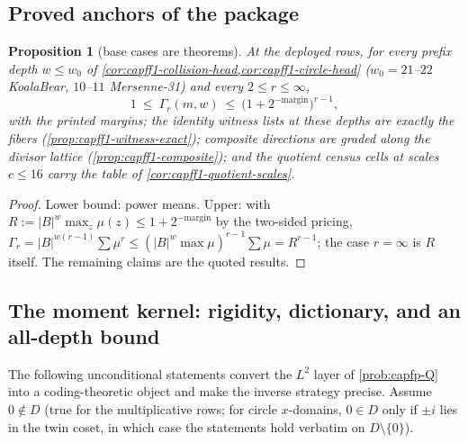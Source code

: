\documentclass[11pt]{article}
\newtheorem{proposition}[proposition]{Proposition}
\theoremstyle{definition}
\theoremstyle{remark}
\newcommand{\B}{B}
\begin{document}
\subsection{Proved anchors of the package}

\begin{proposition}[base cases are theorems]\label{prop:capfp-anchors}
At the deployed rows, for every prefix depth $w\le w_0$ of \cref{cor:capff1-collision-head,cor:capff1-circle-head} \textup($w_0=21$--$22$ KoalaBear, $10$--$11$ Mersenne-31\textup) and every $2\le r\le\infty$,
\[
        1\ \le\ \Gamma_r(m,w)\ \le\ \bigl(1+2^{-\mathrm{margin}}\bigr)^{r-1},
\]
with the printed margins; the identity witness lists at these depths are exactly the fibers \textup(\cref{prop:capff1-witness-exact}\textup); composite directions are graded along the divisor lattice \textup(\cref{prop:capff1-composite}\textup); and the quotient census cells at scales $c\le16$ carry the table of \cref{cor:capff1-quotient-scales}.
\end{proposition}

\begin{proof}
Lower bound: power means.  Upper: with $R:=|\B|^w\max_z\mu(z)\le1+2^{-\mathrm{margin}}$ by the two-sided pricing, $\Gamma_r=|\B|^{w(r-1)}\sum\mu^r\le(|\B|^w\max\mu)^{r-1}\sum\mu=R^{r-1}$; the case $r=\infty$ is $R$ itself.  The remaining claims are the quoted results.
\end{proof}

\subsection{The moment kernel: rigidity, dictionary, and an all-depth bound}

The following unconditional statements convert the $L^2$ layer of \cref{prob:capfp-Q} into a coding-theoretic object and make the inverse strategy precise.  Assume $0\notin D$ \textup(true for the multiplicative rows; for circle $x$-domains, $0\in D$ only if $\pm i$ lies in the twin coset, in which case the statements hold verbatim on $D\setminus\{0\}$\textup).
\end{document}
